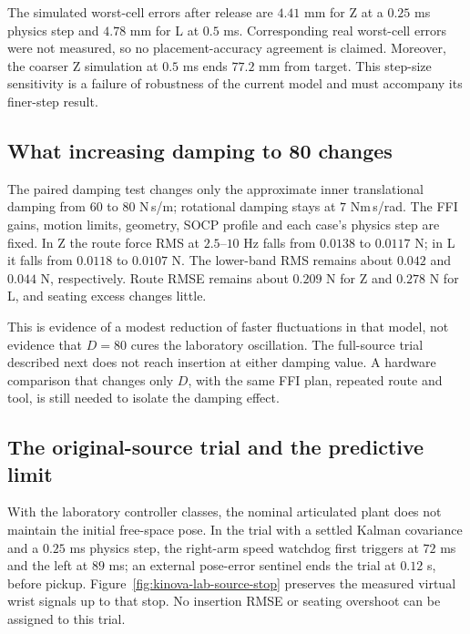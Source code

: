 The simulated worst-cell errors after release are $4.41$ mm for Z at a $0.25$ ms physics step and $4.78$ mm for L at $0.5$ ms. Corresponding real worst-cell errors were not measured, so no placement-accuracy agreement is claimed. Moreover, the coarser Z simulation at $0.5$ ms ends $77.2$ mm from target. This step-size sensitivity is a failure of robustness of the current model and must accompany its finer-step result.

\subsection{What increasing damping to 80 changes}

The paired damping test changes only the approximate inner translational damping from $60$ to $80$ N\,s/m; rotational damping stays at $7$ Nm\,s/rad. The FFI gains, motion limits, geometry, SOCP profile and each case's physics step are fixed. In Z the route force RMS at $2.5$--$10$ Hz falls from $0.0138$ to $0.0117$ N; in L it falls from $0.0118$ to $0.0107$ N. The lower-band RMS remains about $0.042$ and $0.044$ N, respectively. Route RMSE remains about $0.209$ N for Z and $0.278$ N for L, and seating excess changes little.

This is evidence of a modest reduction of faster fluctuations in that model, not evidence that $D=80$ cures the laboratory oscillation. The full-source trial described next does not reach insertion at either damping value. A hardware comparison that changes only $D$, with the same FFI plan, repeated route and tool, is still needed to isolate the damping effect.

\subsection{The original-source trial and the predictive limit}

With the laboratory controller classes, the nominal articulated plant does not maintain the initial free-space pose. In the trial with a settled Kalman covariance and a $0.25$ ms physics step, the right-arm speed watchdog first triggers at $72$ ms and the left at $89$ ms; an external pose-error sentinel ends the trial at $0.12$ s, before pickup. Figure~\ref{fig:kinova-lab-source-stop} preserves the measured virtual wrist signals up to that stop. No insertion RMSE or seating overshoot can be assigned to this trial.


